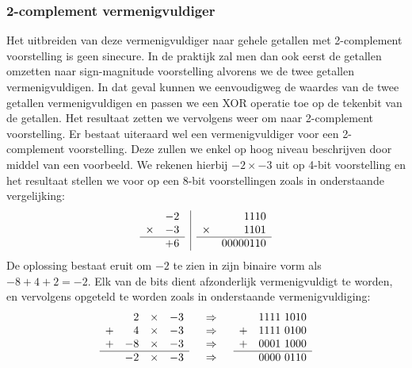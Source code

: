 \subsubsection{2-complement vermenigvuldiger}
Het uitbreiden van deze vermenigvuldiger naar gehele getallen met 2-complement voorstelling is geen sinecure. In de praktijk zal men dan ook eerst de getallen omzetten naar sign-magnitude voorstelling alvorens we de twee getallen vermenigvuldigen. In dat geval kunnen we eenvoudigweg de waardes van de twee getallen vermenigvuldigen en passen we een XOR operatie toe op de tekenbit van de getallen. Het resultaat zetten we vervolgens weer om naar 2-complement voorstelling. Er bestaat uiteraard wel een vermenigvuldiger voor een 2-complement voorstelling. Deze zullen we enkel op hoog niveau beschrijven door middel van een voorbeeld. We rekenen hierbij $-2\times -3$ uit op 4-bit voorstelling en het resultaat stellen we voor op een 8-bit voorstellingen zoals in onderstaande vergelijking:
\begin{equation}
\begin{array}{l|r}
 \begin{array}{lr}
&-2\\
\times&-3\\\hline
&+6
\end{array}&\begin{array}{lr}
&1110\\
\times&1101\\\hline
&00000110
\end{array}
\end{array}
\end{equation}
De oplossing bestaat eruit om $-2$ te zien in zijn binaire vorm als $-8+4+2=-2$. Elk van de bits dient afzonderlijk vermenigvuldigt te worden, en vervolgens opgeteld te worden zoals in onderstaande vermenigvuldiging:
\begin{equation}
\begin{array}{lcr}
\begin{array}{lrcr}
&2&\times&-3\\
+&4&\times&-3\\
+&-8&\times&-3\\\hline
&-2&\times&-3
\end{array}&\begin{array}{c}
\Rightarrow\\
\Rightarrow\\
\Rightarrow\\
\Rightarrow
\end{array}&\begin{array}{lr}
&1111\ 1010\\
+&1111\ 0100\\
+&0001\ 1000\\\hline
&0000\ 0110
\end{array}
\end{array}
\end{equation}
